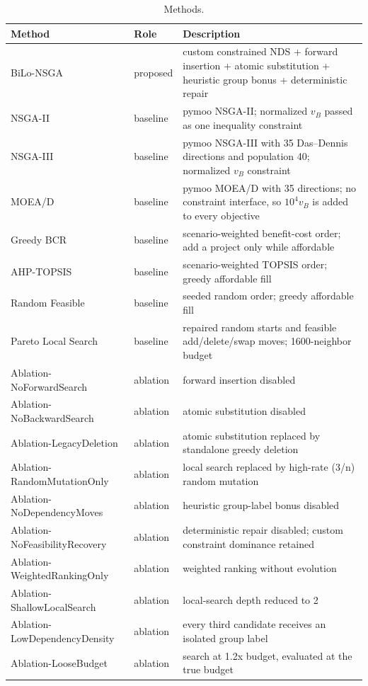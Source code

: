 \documentclass[applsci,article,submit,moreauthors]{Definitions/mdpi}
\begin{document}
\begin{table}[t]
\centering
\scriptsize
\setlength{\tabcolsep}{3pt}
\caption{Methods.}\label{tab:3}
\begin{tabularx}{\textwidth}{@{}>{\raggedright\arraybackslash}X >{\raggedright\arraybackslash}X >{\raggedright\arraybackslash}X@{}}
\toprule
Method & Role & Description \\
\midrule
BiLo-NSGA & proposed & custom constrained NDS + forward insertion + atomic substitution + heuristic group bonus + deterministic repair \\
NSGA-II & baseline & pymoo NSGA-II; normalized $v_B$ passed as one inequality constraint \\
NSGA-III & baseline & pymoo NSGA-III with 35 Das--Dennis directions and population 40; normalized $v_B$ constraint \\
MOEA/D & baseline & pymoo MOEA/D with 35 directions; no constraint interface, so $10^4v_B$ is added to every objective \\
Greedy BCR & baseline & scenario-weighted benefit-cost order; add a project only while affordable \\
AHP-TOPSIS & baseline & scenario-weighted TOPSIS order; greedy affordable fill \\
Random Feasible & baseline & seeded random order; greedy affordable fill \\
Pareto Local Search & baseline & 40 repaired random starts and feasible add/delete/swap moves; 1600-neighbor budget \\
Ablation-NoForwardSearch & ablation & forward insertion disabled \\
Ablation-NoBackwardSearch & ablation & atomic substitution disabled \\
Ablation-LegacyDeletion & ablation & atomic substitution replaced by standalone greedy deletion \\
Ablation-RandomMutationOnly & ablation & local search replaced by high-rate (3/n) random mutation \\
Ablation-NoDependencyMoves & ablation & heuristic group-label bonus disabled \\
Ablation-NoFeasibilityRecovery & ablation & deterministic repair disabled; custom constraint dominance retained \\
Ablation-WeightedRankingOnly & ablation & weighted ranking without evolution \\
Ablation-ShallowLocalSearch & ablation & local-search depth reduced to 2 \\
Ablation-LowDependencyDensity & ablation & every third candidate receives an isolated group label \\
Ablation-LooseBudget & ablation & search at 1.2x budget, evaluated at the true budget \\
\bottomrule
\end{tabularx}
\end{table}
\end{document}
